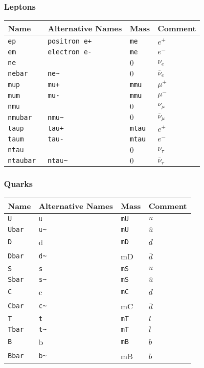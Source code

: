 \subsubsection{Leptons}
\begin{longtable}{|l|l|l|p{2cm}|}
\hline
Name&Alternative Names&Mass&Comment\\
\hline
\texttt{ep }& \texttt{positron e+ }& \texttt{me}& $e^+$\\
\texttt{em }& \texttt{electron e- }& \texttt{me}& $e^-$\\
\texttt{ne }& & $0$ & $\nu_e$\\
\texttt{nebar }& \texttt{ne\~}& $0$ & $\bar{\nu}_e$\\
\hline
\texttt{mup }& \texttt{mu+ }& \texttt{mmu}& $\mu^+$\\
\texttt{mum }& \texttt{mu- }& \texttt{mmu}& $\mu^-$\\
\texttt{nmu }& & $0$ & $\nu_\mu$\\
\texttt{nmubar }& \texttt{nmu\~ }& $0$ & $\bar{\nu}_\mu$\\
\hline
\texttt{taup }& \texttt{tau+ }& \texttt{mtau}& $e^+$\\
\texttt{taum }& \texttt{tau- }& \texttt{mtau}& $e^-$\\
\texttt{ntau }& & $0$ & $\nu_\tau$\\
\texttt{ntaubar }& \texttt{ntau\~ }& $0$ & $\bar{\nu}_\tau$\\
\hline
\end{longtable}

\subsubsection{Quarks}
\begin{longtable}{|l|l|l|p{2cm}|}
\hline
Name&Alternative Names&Mass&Comment\\
\hline
\texttt{U }& \texttt{u }& \texttt{mU}& $u$\\
\texttt{Ubar }& \texttt{u\~ }& \texttt{mU}& $\bar{u}$\\
\texttt{D }& d & \texttt{mD }& $d$\\
\texttt{Dbar }& \texttt{d\~}& mD & $\bar{d}$\\
\hline
\texttt{S }& \texttt{s }& \texttt{mS}& $u$\\
\texttt{Sbar }& \texttt{s\~ }& \texttt{mS}& $\bar{u}$\\
\texttt{C }& c & \texttt{mC }& $d$\\
\texttt{Cbar }& \texttt{c\~}& mC & $\bar{d}$\\
\hline
\texttt{T }& \texttt{t }& \texttt{mT}& $t$\\
\texttt{Tbar }& \texttt{t\~ }& \texttt{mT}& $\bar{t}$\\
\texttt{B }& b & \texttt{mB }& $b$\\
\texttt{Bbar }& \texttt{b\~}& mB & $\bar{b}$\\
\hline
\end{longtable}

